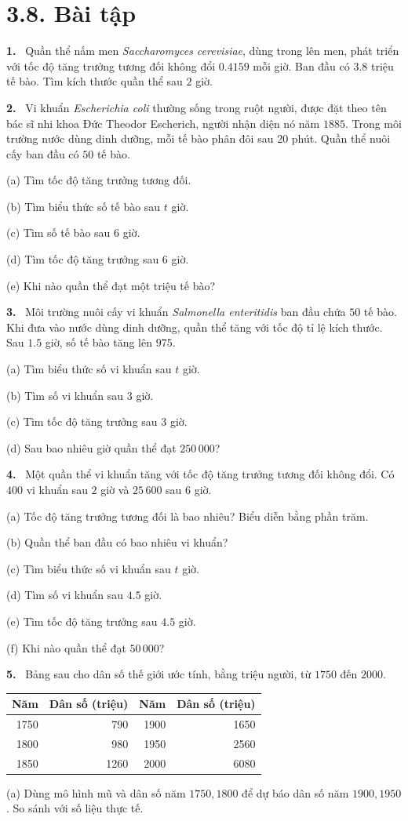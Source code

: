 \documentclass[12pt,a4paper]{article}
\newcommand{\bt}[1]{\par\smallskip\noindent\textbf{#1.}\ }
\begin{document}
\section*{3.8. Bài tập}
\bt{1} Quần thể nấm men \textit{Saccharomyces cerevisiae}, dùng trong lên men, phát triển với tốc độ tăng trưởng tương đối không đổi $0.4159$ mỗi giờ. Ban đầu có $3.8$ triệu tế bào. Tìm kích thước quần thể sau $2$ giờ.
\bt{2} Vi khuẩn \textit{Escherichia coli} thường sống trong ruột người, được đặt theo tên bác sĩ nhi khoa Đức Theodor Escherich, người nhận diện nó năm $1885$. Trong môi trường nước dùng dinh dưỡng, mỗi tế bào phân đôi sau $20$ phút. Quần thể nuôi cấy ban đầu có $50$ tế bào.

(a) Tìm tốc độ tăng trưởng tương đối.

(b) Tìm biểu thức số tế bào sau $t$ giờ.

(c) Tìm số tế bào sau $6$ giờ.

(d) Tìm tốc độ tăng trưởng sau $6$ giờ.

(e) Khi nào quần thể đạt một triệu tế bào?
\bt{3} Môi trường nuôi cấy vi khuẩn \textit{Salmonella enteritidis} ban đầu chứa $50$ tế bào. Khi đưa vào nước dùng dinh dưỡng, quần thể tăng với tốc độ tỉ lệ kích thước. Sau $1.5$ giờ, số tế bào tăng lên $975$.

(a) Tìm biểu thức số vi khuẩn sau $t$ giờ.

(b) Tìm số vi khuẩn sau $3$ giờ.

(c) Tìm tốc độ tăng trưởng sau $3$ giờ.

(d) Sau bao nhiêu giờ quần thể đạt $250\,000$?
\bt{4} Một quần thể vi khuẩn tăng với tốc độ tăng trưởng tương đối không đổi. Có $400$ vi khuẩn sau $2$ giờ và $25\,600$ sau $6$ giờ.

(a) Tốc độ tăng trưởng tương đối là bao nhiêu? Biểu diễn bằng phần trăm.

(b) Quần thể ban đầu có bao nhiêu vi khuẩn?

(c) Tìm biểu thức số vi khuẩn sau $t$ giờ.

(d) Tìm số vi khuẩn sau $4.5$ giờ.

(e) Tìm tốc độ tăng trưởng sau $4.5$ giờ.

(f) Khi nào quần thể đạt $50\,000$?
\bt{5} Bảng sau cho dân số thế giới ước tính, bằng triệu người, từ $1750$ đến $2000$.
\begin{center}\begin{tabular}{rrrr}\toprule
Năm & Dân số (triệu) & Năm & Dân số (triệu)\\\midrule
1750&790&1900&1650\\1800&980&1950&2560\\1850&1260&2000&6080\\\bottomrule
\end{tabular}\end{center}
(a) Dùng mô hình mũ và dân số năm $1750,1800$ để dự báo dân số năm $1900,1950$. So sánh với số liệu thực tế.
\end{document}
